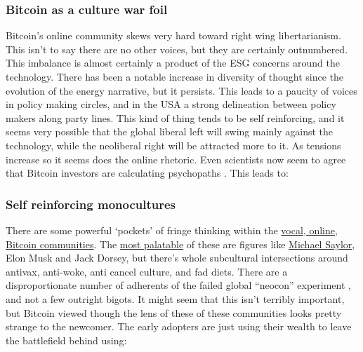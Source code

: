 \subsubsection{Bitcoin as a culture war foil}
Bitcoin's online community skews very hard toward right wing libertarianism. This isn't to say there are no other voices, but they are certainly outnumbered. This imbalance is almost certainly a product of the ESG concerns around the technology. There has been a notable increase in diversity of thought since the evolution of the energy narrative, but it persists. This leads to a paucity of voices in policy making circles, and in the USA a strong delineation between policy makers along party lines. This kind of thing tends to be self reinforcing, and it seems very possible that the global liberal left will swing mainly against the technology, while the neoliberal right will be attracted more to it. As tensions increase so it seems does the online rhetoric. Even scientists now seem to agree that Bitcoin investors are calculating psychopaths \cite{martin2022dark}. This leads to:
\subsubsection{Self reinforcing monocultures}
There are some powerful `pockets' of fringe thinking within the \href{https://pourteaux.substack.com/p/bitcoin-culture-burn-it-to-the-ground?}{vocal, online, Bitcoin communities}. The \href{https://www.forbes.com/sites/peterizzo/2022/07/04/bitcoin-maximalism-is-dead-long-live-bitcoin-maximalism/?}{most palatable} of these are figures like \href{https://www.saylor.org/about/}{Michael Saylor}, Elon Musk and Jack Dorsey, but there's whole subcultural intersections around antivax, anti-woke, anti cancel culture, and fad diets. There are a disproportionate number of adherents of the failed global ``neocon'' experiment \cite{va2010neoconservatism}, and not a few outright bigots. It might seem that this isn't terribly important, but Bitcoin viewed though the lens of these of these communities looks pretty strange to the newcomer. The early adopters are just using their wealth to leave the battlefield behind using:
